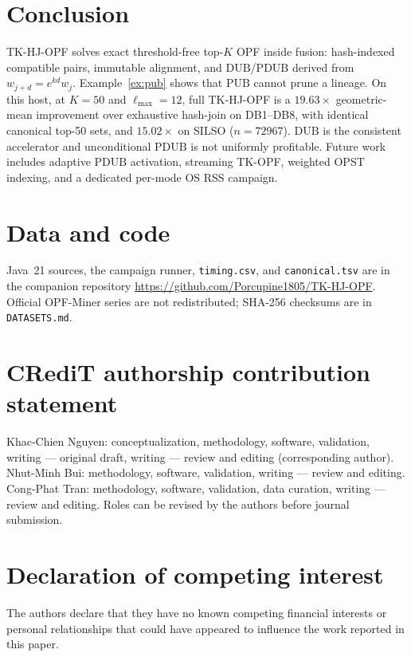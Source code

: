 \documentclass[preprint,12pt]{elsarticle}
\newcommand{\DUB}{\mathrm{DUB}}
\newcommand{\PDUB}{\mathrm{PDUB}}
\newcommand{\PUB}{\mathrm{PUB}}
\theoremstyle{plain}
\theoremstyle{definition}
\theoremstyle{remark}
\begin{document}
\section{Conclusion}
\label{sec:conclusion}

TK-HJ-OPF solves exact threshold-free top-$K$ OPF inside fusion: hash-indexed compatible pairs, immutable alignment, and $\DUB$/$\PDUB$ derived from $w_{j+d}=e^{kd}w_j$. Example~\ref{ex:pub} shows that $\PUB$ cannot prune a lineage. On this host, at $K=50$ and $\ell_{\max}=12$, full TK-HJ-OPF is a $19.63\times$ geometric-mean improvement over exhaustive hash-join on DB1--DB8, with identical canonical top-50 sets, and $15.02\times$ on SILSO ($n=72967$). $\DUB$ is the consistent accelerator and unconditional $\PDUB$ is not uniformly profitable. Future work includes adaptive $\PDUB$ activation, streaming TK-OPF, weighted OPST indexing, and a dedicated per-mode OS RSS campaign.

\section*{Data and code}
Java~21 sources, the campaign runner, \texttt{timing.csv}, and \texttt{canonical.tsv} are in the companion repository \url{https://github.com/Porcupine1805/TK-HJ-OPF}. Official OPF-Miner series are not redistributed; SHA-256 checksums are in \texttt{DATASETS.md}.

\section*{CRediT authorship contribution statement}
Khac-Chien Nguyen: conceptualization, methodology, software, validation, writing --- original draft, writing --- review and editing (corresponding author).
Nhut-Minh Bui: methodology, software, validation, writing --- review and editing.
Cong-Phat Tran: methodology, software, validation, data curation, writing --- review and editing.
Roles can be revised by the authors before journal submission.

\section*{Declaration of competing interest}
The authors declare that they have no known competing financial interests or personal relationships that could have appeared to influence the work reported in this paper.



\end{document}
